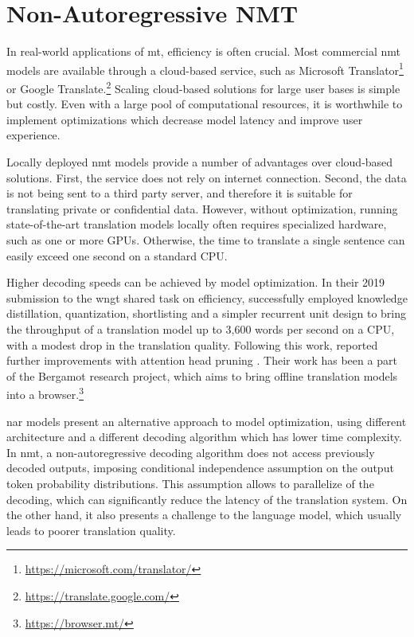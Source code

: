 \chapter{Non-Autoregressive NMT}
\label{chap:nat}

In real-world applications of \ac{mt}, efficiency is often crucial.  Most
commercial \ac{nmt} models are available through a cloud-based service, such as
Microsoft Translator\footnote{\url{https://microsoft.com/translator/}} or
Google Translate.\footnote{\url{https://translate.google.com/}} Scaling
cloud-based solutions for large user bases is simple but costly. Even with a
large pool of computational resources, it is worthwhile to implement
optimizations which decrease model latency and improve user experience.

Locally deployed \ac{nmt} models provide a number of advantages over
cloud-based solutions. First, the service does not rely on internet
connection. Second, the data is not being sent to a third party server, and
therefore it is suitable for translating private or confidential data.
However, without optimization, running state-of-the-art translation models
locally often requires specialized hardware, such as one or more
GPUs. Otherwise, the time to translate a single sentence can easily exceed one
second on a standard CPU.

Higher decoding speeds can be achieved by model optimization. In their 2019
submission to the \ac{wngt} shared task on efficiency,
\citet{kim-etal-2019-research} successfully employed knowledge distillation,
quantization, shortlisting \citep{jean-etal-2015-using} and a simpler recurrent
unit design to bring the throughput of a translation model up to 3,600 words
per second on a CPU, with a modest drop in the translation quality. Following
this work, \citet{bogoychev-etal-2020-edinburghs} reported further improvements
with attention head pruning \citep{voita-etal-2019-analyzing}. Their work has
been a part of the Bergamot research project, which aims to bring offline
translation models into a browser.\footnote{\url{https://browser.mt/}}

\Ac{nar} models present an alternative approach to model optimization, using
different architecture and a different decoding algorithm which has lower time
complexity.  In \ac{nmt}, a non-autoregressive decoding algorithm does not
access previously decoded outputs, imposing conditional independence
assumption on the output token probability distributions. This assumption
allows to parallelize of the decoding, which can significantly reduce the
latency of the translation system. On the other hand, it also presents a
challenge to the language model, which usually leads to poorer translation
quality.

